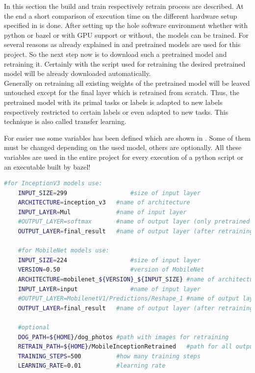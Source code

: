 In this section the build and train respectively retrain process are described. At the end a short comparison of execution time on the different hardware setup specified in  is done.
After setting up the hole software environment whether with python or bazel or with GPU support or without, the models can be trained. For several reasons as already explained in  and  pretrained models are used for this project. So the next step now is to download such a pretrained model and retraining it. Certainly with the script used for retraining the desired pretrained model will be already downloaded automatically. \\

Generally on retraining all existing weights of the pretrained model will be leaved untouched except for the final layer which is retrained from scratch. Thus, the pretrained model with its primal tasks or labels is adapted to new labels respectively restricted to certain labels or even adapted to new tasks. This technique is also called transfer learning. \citep{TensorFlowRetrain2017}

For easier use some variables has been defined which are shown in . Some of them must be changed depending on the used model, others are optionally. All these variables are used in the entire project for every execution of a python script or an executable built by bazel!

\begin{minipage}{\linewidth}
\begin{lstlisting}[caption=Defining terminal variables, label=list:variables, language=bash]
	#for InceptionV3 models	use:
	INPUT_SIZE=299					#size of input layer
	ARCHITECTURE=inception_v3	#name of architecture
	INPUT_LAYER=Mul				#name of input layer
	#OUTPUT_LAYER=softmax		#name of output layer (only pretrained model)
	OUTPUT_LAYER=final_result	#name of output layer (after retraining)
	
	#for MobileNet models use:
	INPUT_SIZE=224					#size of input layer
	VERSION=0.50					#version of MobileNet
	ARCHITECTURE=mobilenet_${VERSION}_${INPUT_SIZE}	#name of architecture
	INPUT_LAYER=input	 			#name of input layer
	#OUTPUT_LAYER=MobilenetV1/Predictions/Reshape_1	#name of output layer (only pretrained model)
	OUTPUT_LAYER=final_result	#name of output layer (after retraining)
	
	#optional
	DOG_PATH=${HOME}/dog_photos	#path with images for retraining
	RETRAIN_PATH=${HOME}/MobileInceptionRetrained	#path for all output data
	TRAINING_STEPS=500			#how many training steps
	LEARNING_RATE=0.01			#learning rate
\end{lstlisting}
\end{minipage}

